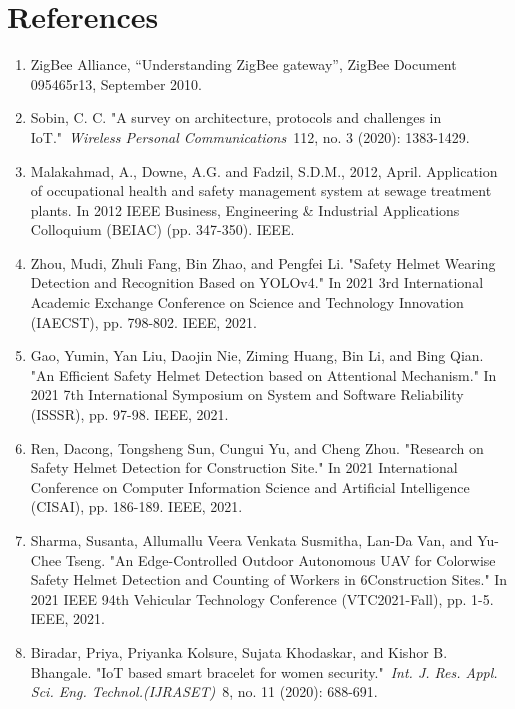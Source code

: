 \documentclass[12pt,a4paper]{report}
\begin{document}
\chapter{References}

\noindent 

\begin{enumerate}
\item  ZigBee Alliance, ``Understanding ZigBee gateway'', ZigBee Document 095465r13, September 2010.

\item  Sobin, C. C. "A survey on architecture, protocols and challenges in IoT."~\textit{Wireless Personal Communications}~112, no. 3 (2020): 1383-1429.

\item  Malakahmad, A., Downe, A.G. and Fadzil, S.D.M., 2012, April. Application of occupational health and safety management system at sewage treatment plants. In 2012 IEEE Business, Engineering \& Industrial Applications Colloquium (BEIAC) (pp. 347-350). IEEE.

\item  Zhou, Mudi, Zhuli Fang, Bin Zhao, and Pengfei Li. "Safety Helmet Wearing Detection and Recognition Based on YOLOv4." In 2021 3rd International Academic Exchange Conference on Science and Technology Innovation (IAECST), pp. 798-802. IEEE, 2021.

\item  Gao, Yumin, Yan Liu, Daojin Nie, Ziming Huang, Bin Li, and Bing Qian. "An Efficient Safety Helmet Detection based on Attentional Mechanism." In 2021 7th International Symposium on System and Software Reliability (ISSSR), pp. 97-98. IEEE, 2021.

\item  Ren, Dacong, Tongsheng Sun, Cungui Yu, and Cheng Zhou. "Research on Safety Helmet Detection for Construction Site." In 2021 International Conference on Computer Information Science and Artificial Intelligence (CISAI), pp. 186-189. IEEE, 2021.

\item  Sharma, Susanta, Allumallu Veera Venkata Susmitha, Lan-Da Van, and Yu-Chee Tseng. "An Edge-Controlled Outdoor Autonomous UAV for Colorwise Safety Helmet Detection and Counting of Workers in 6Construction Sites." In 2021 IEEE 94th Vehicular Technology Conference (VTC2021-Fall), pp. 1-5. IEEE, 2021.

\item   Biradar, Priya, Priyanka Kolsure, Sujata Khodaskar, and Kishor B. Bhangale. "IoT based smart bracelet for women security."~\textit{Int. J. Res. Appl. Sci. Eng. Technol.(IJRASET)}~8, no. 11 (2020): 688-691.


\end{enumerate}
\end{document}
